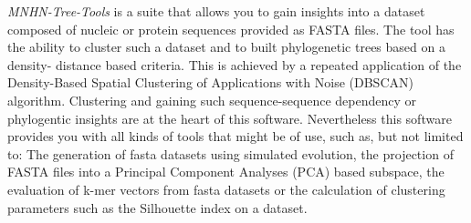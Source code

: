 \emph{MNHN-Tree-Tools} is a suite that allows you to gain insights
into a dataset composed of nucleic or protein sequences provided as
FASTA \cite{fasta} files. The tool has the ability to cluster such a
dataset and to built phylogenetic trees based on a density- distance
based criteria. This is achieved by a repeated application of the
Density-Based Spatial Clustering of Applications with Noise (DBSCAN)
\cite{dbscan} algorithm. Clustering and gaining such sequence-sequence
dependency or phylogentic insights are at the heart of this
software. Nevertheless this software provides you with all kinds of
tools that might be of use, such as, but not limited to: The
generation of fasta datasets using simulated evolution, the projection
of FASTA files into a Principal Component Analyses (PCA) based subspace, the
evaluation of k-mer vectors from fasta datasets or the calculation of
clustering parameters such as the Silhouette \cite{silhouette}
index on a dataset.
